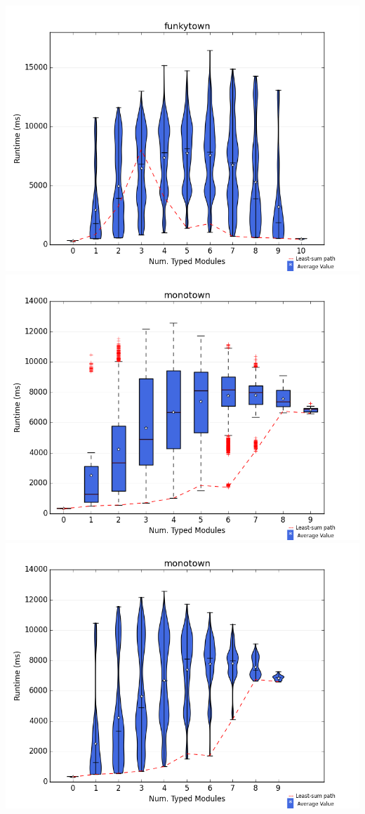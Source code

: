 \documentclass{article}
\begin{document}
\includegraphics[width=\textwidth]{violins/funkytown-violin.png}
\newpage
\includegraphics[width=\textwidth]{boxplots/monotown-boxplot.png}
\includegraphics[width=\textwidth]{violins/monotown-violin.png}
\end{document}

